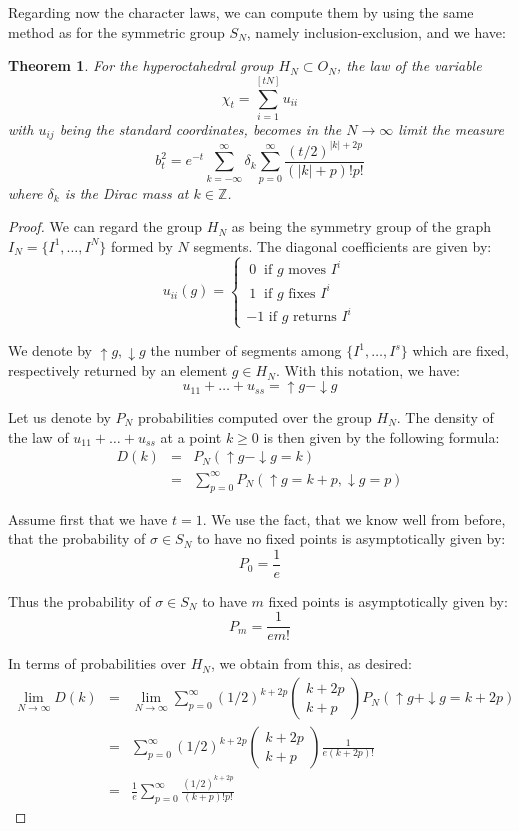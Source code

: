 \documentclass[12pt]{amsbook}
\newtheorem{theorem}{Theorem}[chapter]
\begin{document}
Regarding now the character laws, we can compute them by using the same method as for the symmetric group $S_N$, namely inclusion-exclusion, and we have:


\begin{theorem}
For the hyperoctahedral group $H_N\subset O_N$, the law of the variable
$$\chi_t=\sum_{i=1}^{[tN]}u_{ii}$$
with $u_{ij}$ being the standard coordinates, becomes in the $N\to\infty$ limit the measure
$$b^2_t=e^{-t}\sum_{k=-\infty}^\infty\delta_k\sum_{p=0}^\infty \frac{(t/2)^{|k|+2p}}{(|k|+p)!p!}$$ 
where $\delta_k$ is the Dirac mass at $k\in\mathbb Z$.
\end{theorem}

\begin{proof}
We can regard the group $H_N$ as being the symmetry group of the graph $I_N=\{I^1,\ldots ,I^N\}$ formed by $N$ segments. The diagonal coefficients are given by:
$$u_{ii}(g)=\begin{cases}
\ 0\ \mbox{ if $g$ moves $I^i$}\\
\ 1\ \mbox{ if $g$ fixes $I^i$}\\
-1\mbox{ if $g$ returns $I^i$}
\end{cases}$$

We denote by $\uparrow g,\downarrow g$ the number of segments among $\{I^1,\ldots ,I^s\}$ which are fixed, respectively returned by an element $g\in H_N$. With this notation, we have:
$$u_{11}+\ldots+u_{ss}=\uparrow g-\downarrow g$$

Let us denote by $P_N$ probabilities computed over the group $H_N$. The density of the law of $u_{11}+\ldots+u_{ss}$ at a point $k\geq 0$ is then given by the following formula:
\begin{eqnarray*}
D(k)
&=&P_N(\uparrow g-\downarrow g=k)\\
&=&\sum_{p=0}^\infty P_N(\uparrow g=k+p, \downarrow g=p)
\end{eqnarray*}

Assume first that we have $t=1$. We use the fact, that we know well from before, that the probability of $\sigma\in S_N$ to have no fixed points is asymptotically given by:
$$P_0=\frac{1}{e}$$

Thus the probability of $\sigma\in S_N$ to have $m$ fixed points is asymptotically given by:
$$P_m=\frac{1}{em!}$$

In terms of probabilities over $H_N$, we obtain from this, as desired:
\begin{eqnarray*}
\lim_{N\to\infty}D(k)
&=&\lim_{N\to\infty}\sum_{p=0}^\infty(1/2)^{k+2p}\begin{pmatrix}k+2p\\ k+p\end{pmatrix} P_N(\uparrow g+\downarrow g=k+2p)\\ 
&=&\sum_{p=0}^\infty(1/2)^{k+2p}\begin{pmatrix}k+2p\\
k+p\end{pmatrix}\frac{1}{e(k+2p)!}\\
&=&\frac{1}{e}\sum_{p=0}^\infty \frac{(1/2)^{k+2p}}{(k+p)!p!}
\end{eqnarray*}


\end{proof}
\end{document}
